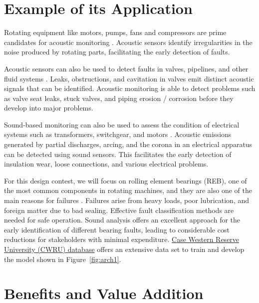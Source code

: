 \documentclass[12pt,twoside]{article}
\begin{document}
\section{Example of its Application}
Rotating equipment like motors, pumps, fans and compressors are prime candidates for acoustic monitoring \cite{judith2017}. Acoustic sensors identify irregularities in the noise produced by rotating parts, facilitating the early detection of faults.

Acoustic sensors can also be used to detect faults in valves, pipelines, and other fluid systems \cite{judith2017}. Leaks, obstructions, and cavitation in valves emit distinct acoustic signals that can be identified. Acoustic monitoring is able to detect problems such as valve seat leaks, stuck valves, and piping erosion / corrosion before they develop into major problems.

Sound-based monitoring can also be used to assess the condition of electrical systems such as transformers, switchgear, and motors \cite{avinton2023}. Acoustic emissions generated by partial discharges, arcing, and the corona in an electrical apparatus can be detected using sound sensors. This facilitates the early detection of insulation wear, loose connections, and various electrical problems.

For this design contest, we will focus on rolling element bearings (REB), one of the most common components in rotating machines, and they are also one of the main reasons for failures \cite{jiang2019bearing}. 
Failures arise from heavy loads, poor lubrication, and foreign matter due to bad sealing. Effective fault classification methods are needed for safe operation. Sound analysis offers an excellent approach for the early identification of different bearing faults, leading to considerable cost reductions for stakeholders with minimal expenditure. \href{https://engineering.case.edu/bearingdatacenter}{Case Western Reserve University (CWRU) database} \cite{case2019} offers an extensive data set to train and develop the model shown in Figure~\ref{fig:arch1}. 

\section{Benefits and Value Addition}
\end{document}
